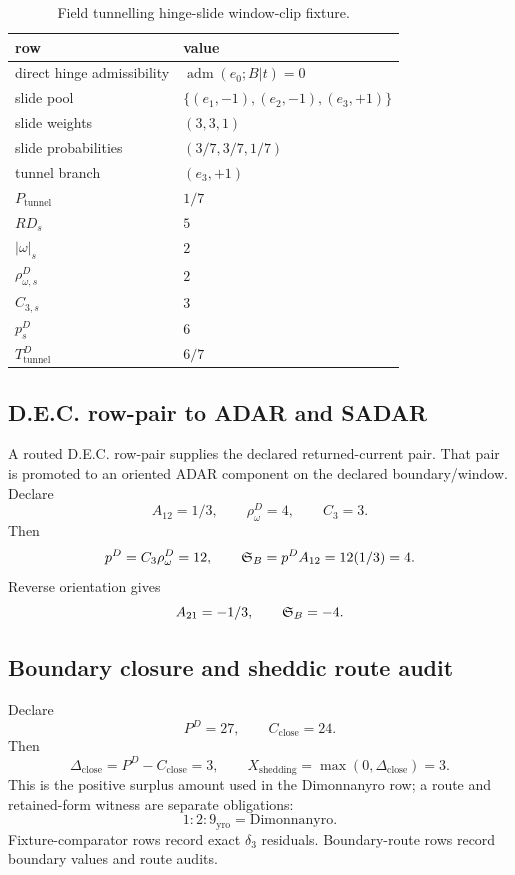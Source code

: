 \begin{table}[H]
\centering
\scriptsize
\caption{Field tunnelling hinge-slide window-clip fixture.}
\begin{tabular}{l l}
\toprule
row & value\\
\midrule
direct hinge admissibility & $\operatorname{adm}(e_0;B|t)=0$\\
slide pool & $\{(e_1,-1),(e_2,-1),(e_3,+1)\}$\\
slide weights & $(3,3,1)$\\
slide probabilities & $(3/7,3/7,1/7)$\\
tunnel branch & $(e_3,+1)$\\
$P_{\mathrm{tunnel}}$ & $1/7$\\
$RD_s$ & $5$\\
$|\omega|_s$ & $2$\\
$\rho^D_{\omega,s}$ & $2$\\
$C_{3,s}$ & $3$\\
$p^D_s$ & $6$\\
$T^D_{\mathrm{tunnel}}$ & $6/7$\\
\bottomrule
\end{tabular}
\label{tab:manual-field-tunnelling-fixture}
\end{table}

\subsection{D.E.C. row-pair to ADAR and SADAR}\label{manual:dec-ledger:adar-sadar}
A routed D.E.C. row-pair supplies the declared returned-current pair. That pair is promoted to an oriented ADAR component on the declared boundary/window. Declare
\[
A_{12}=1/3,
\qquad
\rho^D_\omega=4,
\qquad
C_3=3.
\]
Then
\[
p^D=C_3\rho^D_\omega=12,
\qquad
\mathfrak S_B=p^D A_{12}=12(1/3)=4.
\]
Reverse orientation gives
\[
A_{21}=-1/3,
\qquad
\mathfrak S_B=-4.
\]

\subsection{Boundary closure and sheddic route audit}\label{manual:dec-ledger:boundary-audit}
Declare
\[
P^D=27,
\qquad
C_{\mathrm{close}}=24.
\]
Then
\[
\Delta_{\mathrm{close}}=P^D-C_{\mathrm{close}}=3,
\qquad
X_{\mathrm{shedding}}=\max(0,\Delta_{\mathrm{close}})=3.
\]
This is the positive surplus amount used in the Dimonnanyro row; a route and retained-form witness are separate obligations:
\[
1{:}2{:}9_{\mathrm{yro}}=\mathrm{Dimonnanyro}.
\]
Fixture-comparator rows record exact \(\delta_3\) residuals. Boundary-route rows record boundary values and route audits.


